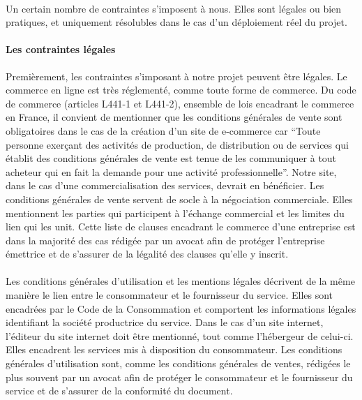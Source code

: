 \documentclass[a4paper, 12pt]{article}
\begin{document}
\paragraph{}Un certain nombre de contraintes s’imposent à nous. Elles sont légales ou bien pratiques, et uniquement résolubles dans le cas d’un déploiement réel du projet.
\paragraph{Les contraintes légales}Premièrement, les contraintes s’imposant à notre projet peuvent être légales. Le commerce en ligne est très réglementé, comme toute forme de commerce. Du code de commerce (articles L441-1 et L441-2), ensemble de lois encadrant le commerce en France, il convient de mentionner que les conditions générales de vente sont obligatoires dans le cas de la création d’un site de e-commerce car “Toute personne exerçant des activités de production, de distribution ou de services qui établit des conditions générales de vente est tenue de les communiquer à tout acheteur qui en fait la demande pour une activité professionnelle”\cite{code_commerce_1}. Notre site, dans le cas d’une commercialisation des services, devrait en bénéficier. Les conditions générales de vente servent de socle à la négociation commerciale.\cite{code_commerce_1} Elles mentionnent les parties qui participent à l’échange commercial et les limites du lien qui les unit. Cette liste de clauses encadrant le commerce d’une entreprise est dans la majorité des cas rédigée par un avocat afin de protéger l’entreprise émettrice et de s’assurer de la légalité des clauses qu’elle y inscrit.
\paragraph{}Les conditions générales d’utilisation et les mentions légales décrivent de la même manière le lien entre le consommateur et le fournisseur du service. Elles sont encadrées par le Code de la Consommation et comportent les informations légales identifiant la société productrice du service\cite{code_consommation}. Dans le cas d’un site internet, l’éditeur du site internet doit être mentionné, tout comme l’hébergeur de celui-ci. Elles encadrent les services mis à disposition du consommateur. Les conditions générales d’utilisation sont, comme les conditions générales de ventes, rédigées le plus souvent par un avocat afin de protéger le consommateur et le fournisseur du service et de s’assurer de la conformité du document.
\end{document}
